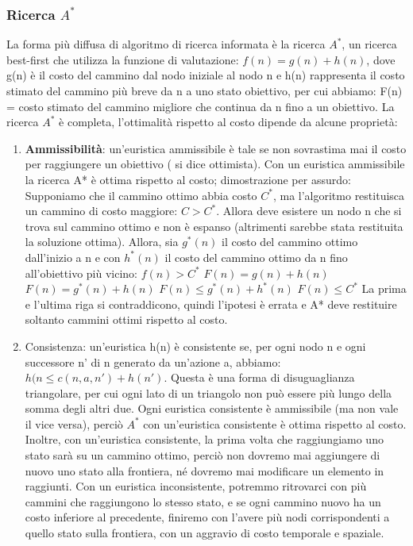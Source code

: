 \documentclass{article}
\begin{document}
\subsubsection{Ricerca $A^*$}
La forma più diffusa di algoritmo di ricerca informata è la ricerca $A^*$, un ricerca best-first che utilizza la funzione di valutazione: $f(n) = g(n) +h(n)$, dove g(n) è il costo del cammino dal nodo iniziale al nodo n e h(n) rappresenta il costo stimato del cammino più breve da n a uno stato obiettivo, per cui abbiamo:
F(n) = costo stimato del cammino migliore che continua da n fino a un obiettivo. La ricerca $A^*$ è completa, l'ottimalità rispetto al costo dipende da alcune proprietà:
\begin{enumerate}
    \item \textbf{Ammissibilità}: un'euristica ammissibile è tale se non sovrastima mai il costo per raggiungere un obiettivo ( si dice ottimista). Con un euristica ammissibile la ricerca A* è ottima rispetto al costo; dimostrazione per assurdo:
    Supponiamo che il cammino ottimo abbia costo $C^*$, ma l'algoritmo restituisca un cammino di costo maggiore: $C>C^*$. Allora deve esistere un nodo n che si trova sul cammino ottimo e non è espanso (altrimenti sarebbe stata restituita la soluzione ottima). Allora, sia $g^*(n)$ il costo del cammino ottimo dall'inizio a n e con $h^*(n)$ il costo del cammino ottimo da n fino all'obiettivo più vicino:\newline
    {%
    \centering
    $f(n)>C^*$\newline
    $F(n)=g(n)+h(n)$\newline
    $F(n)=g^*(n)+h(n)$\newline
    $F(n)\leq g^*(n)+h^*(n)$\newline
    $F(n)\leq C^* $\newline
    }
    La prima e l'ultima riga si contraddicono, quindi l'ipotesi è errata e A* deve restituire soltanto cammini ottimi rispetto al costo.
    \item Consistenza: un'euristica h(n) è consistente se, per ogni nodo n e ogni successore n' di n generato da un'azione a, abbiamo: $h(n\leq c(n, a, n')+h(n')$. Questa è una forma di disuguaglianza triangolare, per cui ogni lato di un triangolo non può essere più lungo della somma degli altri due. Ogni euristica consistente è ammissibile (ma non vale il vice versa), perciò $A^*$ con un'euristica consistente è ottima rispetto al costo. Inoltre, con un'euristica consistente, la prima volta che raggiungiamo uno stato sarà su un cammino ottimo, perciò non dovremo mai aggiungere di nuovo uno stato alla frontiera, né dovremo mai modificare un elemento in raggiunti. Con un euristica inconsistente, potremmo ritrovarci con più cammini che raggiungono lo stesso stato, e se ogni cammino nuovo ha un costo inferiore al precedente, finiremo con l'avere più nodi corrispondenti a quello stato sulla frontiera, con un aggravio di costo temporale e spaziale.
\end{enumerate}
\end{document}
